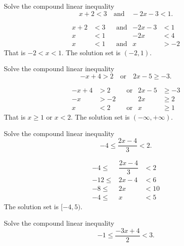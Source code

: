 \documentclass[en,12pt]{elegantbook}
\let\BeginKnitrBlock\begin \let\EndKnitrBlock\end
\begin{document}
\BeginKnitrBlock{example}
\protect\hypertarget{exm:unnamed-chunk-198}{}{\label{exm:unnamed-chunk-198} }
Solve the compound linear inequality
\[
x+2<3\quad \text{and}\quad -2x-3<1.
\]
\EndKnitrBlock{example}

\BeginKnitrBlock{solution}


\[
\begin{aligned}
    x+2 & <3 &  & \text{and} & -2x-3 & <1  \\
    x   & <1 &  &            & -2x   & <4  \\
    x   & <1 &  & \text{and} & x     & >-2
\end{aligned}
\]
That is \(-2<x<1\). The solution set is \((-2, 1)\).
\EndKnitrBlock{solution}

\BeginKnitrBlock{example}
\protect\hypertarget{exm:unnamed-chunk-200}{}{\label{exm:unnamed-chunk-200} }
Solve the compound linear inequality\\
\[
-x+4>2 \quad \text{or} \quad 2x-5\geq -3.
\]
\EndKnitrBlock{example}

\BeginKnitrBlock{solution}


\[
\begin{aligned}
    -x+4 & >2  &  & \text{or} & 2x-5 & \geq -3 \\
    -x   & >-2 &  &           & 2x   & \geq 2  \\
    x    & <2  &  & \text{or} & x    & \geq 1
\end{aligned}
\]
That is \(x\geq 1\) or \(x< 2\). The solution set is \((-\infty, +\infty)\).
\EndKnitrBlock{solution}

\BeginKnitrBlock{example}
\protect\hypertarget{exm:unnamed-chunk-202}{}{\label{exm:unnamed-chunk-202} }
Solve the compound linear inequality
\[
-4\leq\dfrac{2x-4}{3}<2.
\]
\EndKnitrBlock{example}

\BeginKnitrBlock{solution}


\[
\begin{array}{rcl}
    -4\leq  & \dfrac{2x-4}{3}    & <2  \\
    -12\leq & 2x-4         & <6  \\
    -8\leq  & 2x                & <10 \\
    -4\leq  & x               & <5  
\end{array}
\]
The solution set is \([-4, 5)\).
\EndKnitrBlock{solution}

\BeginKnitrBlock{example}
\protect\hypertarget{exm:unnamed-chunk-204}{}{\label{exm:unnamed-chunk-204} }
Solve the compound linear inequality
\[
-1\leq \dfrac{-3x+4}{2}<3.
\]
\EndKnitrBlock{example}
\end{document}
